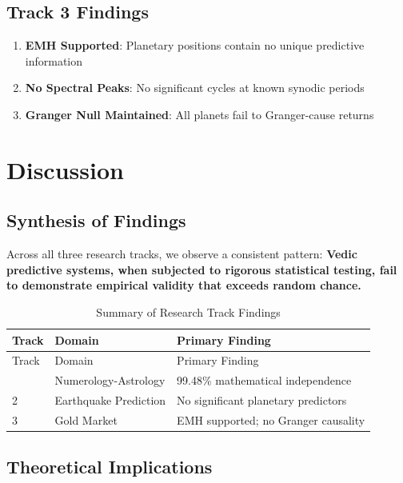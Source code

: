 \documentclass[
  11pt,
  a4paper,
  oneside,
  openany]{article}
\providecommand{\tightlist}{%
  \setlength{\itemsep}{0pt}\setlength{\parskip}{0pt}}\usepackage{longtable,booktabs,array}
\begin{document}
\subsection{Track 3 Findings}\label{track-3-findings}

\begin{enumerate}
\def\labelenumi{\arabic{enumi}.}
\tightlist
\item
  \textbf{EMH Supported}: Planetary positions contain no unique
  predictive information
\item
  \textbf{No Spectral Peaks}: No significant cycles at known synodic
  periods
\item
  \textbf{Granger Null Maintained}: All planets fail to Granger-cause
  returns
\end{enumerate}

\section{Discussion}\label{discussion}

\subsection{Synthesis of Findings}\label{synthesis-of-findings}

Across all three research tracks, we observe a consistent pattern:
\textbf{Vedic predictive systems, when subjected to rigorous statistical
testing, fail to demonstrate empirical validity that exceeds random
chance.}

\begin{longtable}[]{@{}lll@{}}
\caption{Summary of Research Track
Findings}\label{tbl-summary}\tabularnewline
\toprule\noalign{}
Track & Domain & Primary Finding \\
\midrule\noalign{}
\endfirsthead
\toprule\noalign{}
Track & Domain & Primary Finding \\
\midrule\noalign{}
\endhead
\bottomrule\noalign{}
\endlastfoot
1 & Numerology-Astrology & 99.48\% mathematical independence \\
2 & Earthquake Prediction & No significant planetary predictors \\
3 & Gold Market & EMH supported; no Granger causality \\
\end{longtable}

\subsection{Theoretical Implications}\label{theoretical-implications}
\end{document}
